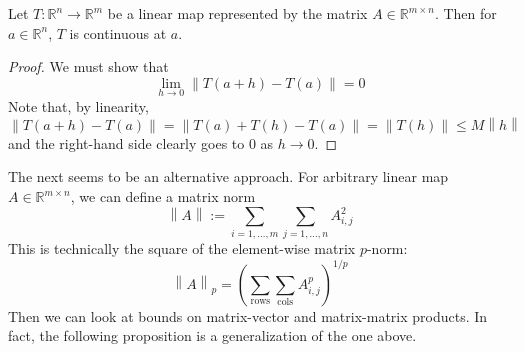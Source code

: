 \begin{lemma}
Let $T: \mathbb{R}^n \rightarrow \mathbb{R}^m$ be a linear map represented by the matrix $A \in \mathbb{R}^{m \times n}$. Then for $a \in \mathbb{R}^n$, $T$ is continuous at $a$.
\end{lemma}
\begin{proof}
We must show that \[ \lim_{h\rightarrow 0} \left\lVert T\left(a+h\right) - T\left(a\right) \right\rVert =0 \] Note that, by linearity, \[ \left\lVert T\left(a+h\right) - T\left(a\right) \right\rVert = \left\lVert T\left(a\right) + T\left(h\right) - T\left(a\right) \right\rVert = \left\lVert T\left(h\right) \right\rVert  \leq M \left\lVert h \right\rVert \] and the right-hand side clearly goes to $0$ as $h \rightarrow 0$. 
\end{proof}







The next seems to be an alternative approach. For arbitrary linear map $A\in \mathbb{R}^{m\times n}$, we can define a matrix norm \[ \left\lVert A \right\rVert := \sum_{i = 1,\ldots, m } \sum_{j=1,\ldots,n} A_{i,j}^2 \] This is technically the square of the element-wise matrix $p$-norm: \[ \left\lVert A \right\rVert_p = \left( \sum_{\text{rows}}\sum_{\text{cols}} A_{i,j}^p  \right)^{1/p}\]Then we can look at bounds on matrix-vector and matrix-matrix products. In fact, the following proposition is a generalization of the one above.

